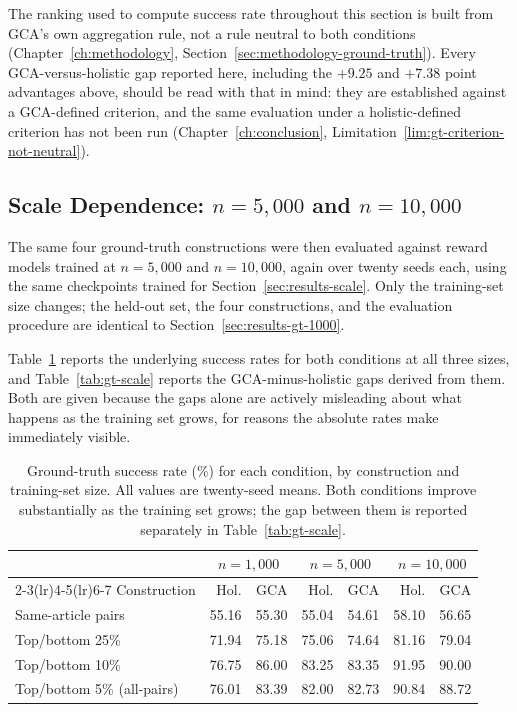 The ranking used to compute success rate throughout this section is built
from GCA's own aggregation rule, not a rule neutral to both conditions
(Chapter~\ref{ch:methodology}, Section~\ref{sec:methodology-ground-truth}).
Every GCA-versus-holistic gap reported here, including the $+9.25$ and
$+7.38$ point advantages above, should be read with that in mind: they are
established against a GCA-defined criterion, and the same evaluation under
a holistic-defined criterion has not been run
(Chapter~\ref{ch:conclusion}, Limitation~\ref{lim:gt-criterion-not-neutral}).

\subsection{Scale Dependence: \texorpdfstring{$n=5{,}000$}{n=5,000} and \texorpdfstring{$n=10{,}000$}{n=10,000}}
\label{sec:results-gt-scale}

The same four ground-truth constructions were then evaluated against reward
models trained at $n=5{,}000$ and $n=10{,}000$, again over twenty seeds each,
using the same checkpoints trained for Section~\ref{sec:results-scale}. Only
the training-set size changes; the held-out set, the four constructions, and
the evaluation procedure are identical to
Section~\ref{sec:results-gt-1000}.

Table~\ref{tab:gt-scale-absolute} reports the underlying success rates for
both conditions at all three sizes, and Table~\ref{tab:gt-scale} reports the
GCA-minus-holistic gaps derived from them. Both are given because the gaps
alone are actively misleading about what happens as the training set grows,
for reasons the absolute rates make immediately visible.

\begin{table}[htbp]
\centering
\caption[Ground-truth success rate by condition and training-set size]{Ground-truth success rate (\%) for each condition, by construction
and training-set size. All values are twenty-seed means. Both conditions
improve substantially as the training set grows; the gap between them is
reported separately in Table~\ref{tab:gt-scale}.}
\label{tab:gt-scale-absolute}
\begin{tabular}{lrrrrrr}
\toprule
& \multicolumn{2}{c}{$n=1{,}000$} & \multicolumn{2}{c}{$n=5{,}000$}
  & \multicolumn{2}{c}{$n=10{,}000$} \\
\cmidrule(lr){2-3}\cmidrule(lr){4-5}\cmidrule(lr){6-7}
Construction & Hol. & GCA & Hol. & GCA & Hol. & GCA \\
\midrule
Same-article pairs         & 55.16 & 55.30 & 55.04 & 54.61 & 58.10 & 56.65 \\
Top/bottom 25\%            & 71.94 & 75.18 & 75.06 & 74.64 & 81.16 & 79.04 \\
Top/bottom 10\%            & 76.75 & 86.00 & 83.25 & 83.35 & 91.95 & 90.00 \\
Top/bottom 5\% (all-pairs) & 76.01 & 83.39 & 82.00 & 82.73 & 90.84 & 88.72 \\
\bottomrule
\end{tabular}
\end{table}

